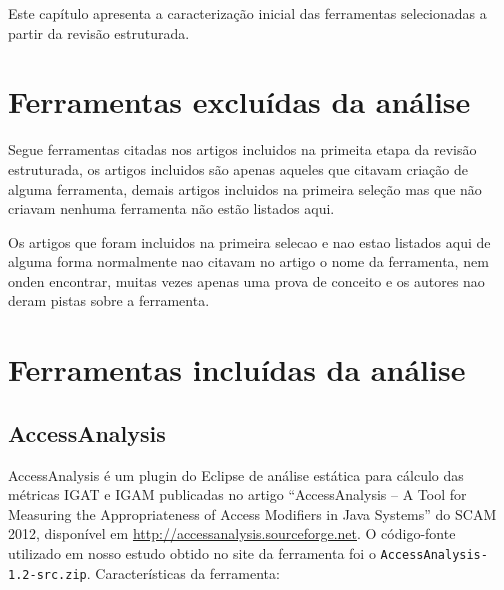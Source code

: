 {Este capítulo apresenta a caracterização inicial das ferramentas selecionadas a partir da revisão estruturada.}
\label{caracterizacao-ferramentas}


\section{Ferramentas excluídas da análise}

Segue ferramentas citadas nos artigos incluidos na primeita etapa da revisão
estruturada, os artigos incluidos são apenas aqueles que citavam criação de
alguma ferramenta, demais artigos incluidos na primeira seleção mas que não
criavam nenhuma ferramenta não estão listados aqui.

Os artigos que foram incluidos na primeira selecao e nao estao listados aqui de alguma forma
normalmente nao citavam no artigo o nome da ferramenta, nem onden encontrar, muitas vezes
apenas uma prova de conceito e os autores nao deram pistas sobre a ferramenta.

\section{Ferramentas incluídas da análise}

\subsection{AccessAnalysis}

AccessAnalysis é um plugin do Eclipse de análise estática 
para cálculo das métricas IGAT e IGAM
publicadas no artigo ``AccessAnalysis -- A Tool for Measuring the
Appropriateness of Access Modifiers in Java Systems'' do SCAM 2012,
disponível em \url{http://accessanalysis.sourceforge.net}. O código-fonte
utilizado em nosso estudo obtido no site da ferramenta foi o
\texttt{AccessAnalysis-1.2-src.zip}. Características da ferramenta:

